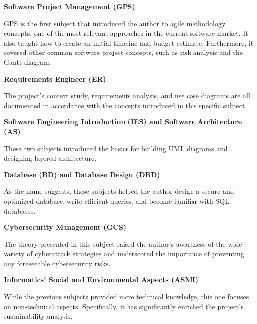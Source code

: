 \vspace{0.2cm}
\textbf{Software Project Management (GPS)}
\vspace{-0.1cm}

GPS is the first subject that introduced the author to agile methodology concepts, one of the most relevant approaches in the current software market. It also taught how to create an initial timeline and budget estimate. Furthermore, it covered other common software project concepts, such as risk analysis and the Gantt diagram.

\vspace{2cm}
\textbf{Requirements Engineer (ER)}
\vspace{-0.1cm}

The project's context study, requirements analysis, and use case diagrams are all documented in accordance with the concepts introduced in this specific subject.

\vspace{0.2cm}
\textbf{Software Engineering Introduction (IES) and Software Architecture (AS)}
\vspace{-0.1cm}

These two subjects introduced the basics for building UML diagrams and designing layered architecture.

\vspace{0.2cm}
\textbf{Database (BD) and Database Design (DBD)}
\vspace{-0.1cm}

As the name suggests, these subjects helped the author design a secure and optimized database, write efficient queries, and become familiar with SQL databases.

\vspace{0.2cm}
\textbf{Cybersecurity Management (GCS)}
\vspace{-0.1cm}

The theory presented in this subject raised the author's awareness of the wide variety of cyberattack strategies and underscored the importance of preventing any foreseeable cybersecurity risks.

\vspace{0.2cm}
\textbf{Informatics' Social and Environmental Aspects (ASMI)}
\vspace{-0.1cm}

While the previous subjects provided more technical knowledge, this one focuses on non-technical aspects. Specifically, it has significantly enriched the project's sustainability analysis.
